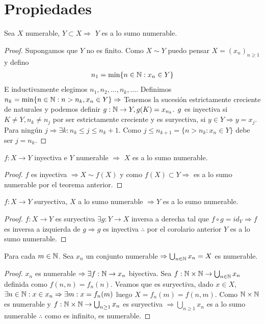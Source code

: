 \section{Propiedades}

\begin{theorem}
	Sea \(X\) numerable, \(Y \subset X \Rightarrow \) \(Y\) es a lo sumo numerable.
	\begin{proof}
		Supongamos que \(Y\) no es finito. Como \(X \sim Y\) puedo pensar \(X = {(x_n)}_{n\geq1} \) y defino
		\begin{align*}
			n_1= \min \{ n \in \mathbb{N}: x_n \in Y \}
		\end{align*}
		E inductivamente elegimos \(n_1, n_2, \ldots , n_k, \ldots \). Definimos \(n_k = \min \{ n \in \mathbb{N} : n > n_k, x_n \in Y \} \Rightarrow \) Tenemos la sucesión estrictamente creciente de naturales y podemos definir \(g: \mathbb{N} \to Y, g(K) = x_{n_k} \text{. } g\) es inyectiva si \(K\neq Y, n_k \neq n_j\) por ser estrictamente creciente y es suryectiva, si \(y \in Y \Rightarrow y = x_j\). Para ningún \(j \Rightarrow \exists k :n_k\leq j \leq n_k+1\). Como \(j \leq n_{k+1}=\{ n>n_k:x_n \in Y \} \) debe ser \(j = n_k\).
	\end{proof}
\end{theorem}

\begin{corollary}
	\(f: X \to Y\) inyectiva e \(Y\) numerable \(\Rightarrow \) \(X\) es a lo sumo numerable.
	\begin{proof}
		\(f\) es inyectiva \(\Rightarrow X \sim f(X)\) y como \(f(X) \subset Y \Rightarrow \) es a lo sumo numerable por el teorema anterior.
	\end{proof}
\end{corollary}

\begin{theorem}
	\(f: X \to Y\) suryectiva, \(X\) a lo sumo numerable \(\Rightarrow Y\) es a lo sumo numerable.
	\begin{proof}
		\(f: X \to Y\) es suryectiva \(\exists g: Y \to X\) inversa a derecha tal que \(f \circ g = id_Y \Rightarrow f\) es inversa a izquierda de \(g \Rightarrow g\) es inyectiva \(\therefore \) por el corolario anterior \(Y\) es a lo sumo numerable.
	\end{proof}
\end{theorem}

\begin{theorem}
	Para cada \(m \in \mathbb{N} \). Sea \(x_n\) un conjunto numerable \(\Rightarrow \bigcup_{n \in \mathbb{N}}x_n = X\) es numerable.
	\begin{proof}
		\(x_n\) es numerable \(\Rightarrow \exists f:\mathbb{N} \to x_n\) biyectiva. Sea \(f:\mathbb{N} \times \mathbb{N} \to \bigcup_{n \in \mathbb{N}} x_n\) definida como \(f(n, n) = f_n(n)\). Veamos que es suryectiva, dado \(x \in X\), \(\exists n \in \mathbb{N}:x \in x_n \Rightarrow \exists m:x=f_n(m)\) luego \(X=f_n(m) = f(n, m)\). Como \(\mathbb{N} \times \mathbb{N} \) es numerable y \(f: \mathbb{N} \times \mathbb{N} \to \bigcup_{n \geq 1}{x_n} \) es suryectiva \(\Rightarrow \bigcup_{n \geq 1}x_n\) es a lo sumo numerable \(\therefore \) como es infinito, es numerable.
	\end{proof}
\end{theorem}

